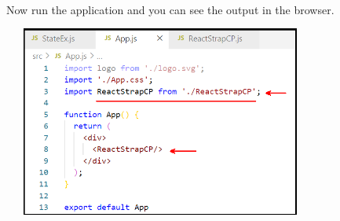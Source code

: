 \documentclass{article}
\begin{document}
\noindent 

\noindent \\
Now run the application and you can see the output in the browser.

\begin{center}
	\noindent \includegraphics*[width=4.08in, height=2.47in]{IMG-09-26}
\end{center}
\end{document}
